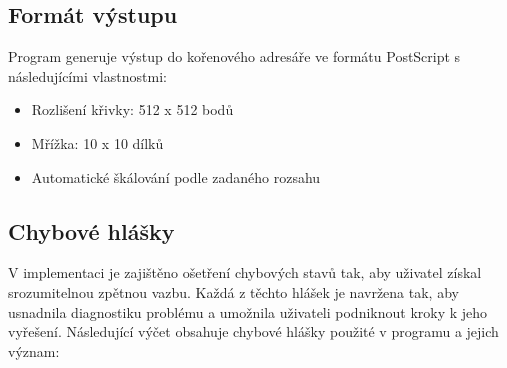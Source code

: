 \documentclass[12pt]{article} %
\begin{document}
\subsection{Formát výstupu}
Program generuje výstup do kořenového adresáře ve formátu PostScript s následujícími vlastnostmi:
\begin{itemize}
\item Rozlišení křivky: 512 x 512 bodů
\item Mřížka: 10 x 10 dílků
\item Automatické škálování podle zadaného rozsahu
\end{itemize}

\subsection{Chybové hlášky}

V implementaci je zajištěno ošetření chybových stavů tak, aby uživatel získal srozumitelnou zpětnou vazbu. Každá z těchto hlášek je navržena tak, aby usnadnila diagnostiku problému a umožnila
uživateli podniknout kroky k jeho vyřešení. Následující výčet obsahuje chybové hlášky použité v programu a jejich význam:
\end{document}
